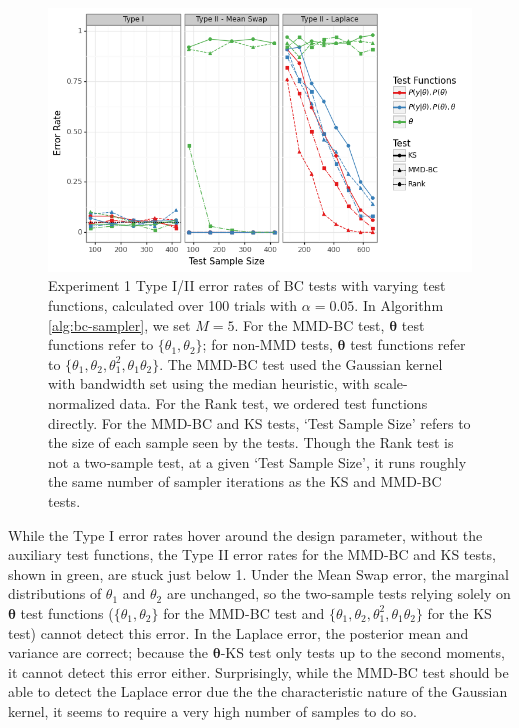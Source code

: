 \documentclass[a4paper,11pt]{article}
\begin{document}
\begin{figure}
    \centering
    \includegraphics[width=\textwidth]{figures/gandy_scott_aux.png}
    \caption{Experiment 1 Type I/II error rates of BC tests with varying test functions, calculated over 100 trials with $\alpha=0.05$. In Algorithm \ref{alg:bc-sampler}, we set $M=5$. For the MMD-BC test, $\mathbf{\theta}$ test functions refer to $\{\theta_{1}, \theta_{2}\}$; for non-MMD tests, $\mathbf{\theta}$ test functions refer to $\{\theta_{1}, \theta_{2}, \theta_{1}^{2}, \theta_{1}\theta_{2}\}$. The MMD-BC test used the Gaussian kernel with bandwidth set using the median heuristic, with scale-normalized data. For the Rank test, we ordered test functions directly. For the MMD-BC and KS tests, `Test Sample Size' refers to the size of each sample seen by the tests. Though the Rank test is not a two-sample test, at a given `Test Sample Size', it runs roughly the same number of sampler iterations as the KS and MMD-BC tests.}
    \label{fig:ex1_aux}
\end{figure}

While the Type I error rates hover around the design parameter, without the auxiliary test functions, the Type II error rates for the MMD-BC and KS tests, shown in green, are stuck just below 1. Under the Mean Swap error, the marginal distributions of $\theta_{1}$ and $\theta_{2}$ are unchanged, so the two-sample tests relying solely on $\mathbf{\theta}$ test functions ($\{\theta_{1}, \theta_{2}\}$ for the MMD-BC test and $\{\theta_{1}, \theta_{2}, \theta_{1}^{2}, \theta_{1}\theta_{2}\}$ for the KS test) cannot detect this error. In the Laplace error, the posterior mean and variance are correct; because the $\mathbf{\theta}$-KS test only tests up to the second moments, it cannot detect this error either. Surprisingly, while the MMD-BC test should be able to detect the Laplace error due the the characteristic nature of the Gaussian kernel, it seems to require a very high number of samples to do so.
\end{document}
